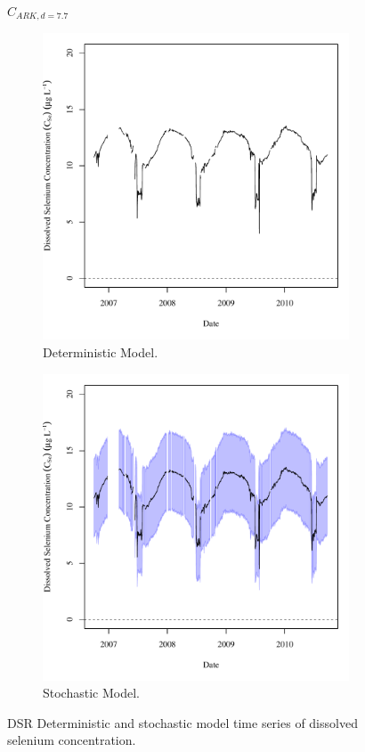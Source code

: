 \subfiguremid
\begin{landscape}
	\begin{figure}
		$ C_{ARK,d=7.7} $
		\begin{subfigure}{0.7\textwidth}
			\centering
			\includegraphics[width=\tableCustomSize]{"Figures/Results_DSR/Deterministic/c TS BUF"}
			\caption{Deterministic Model.}
		\end{subfigure}%
		\begin{subfigure}{0.7\textwidth}
			\centering
			\includegraphics[width=\tableCustomSize]{"Figures/Results_DSR/Stochastic/c TS BUF"}
			\caption{Stochastic Model.}
		\end{subfigure}
		\caption{DSR Deterministic and stochastic model time series of dissolved selenium concentration.}
	\end{figure}
\end{landscape}

